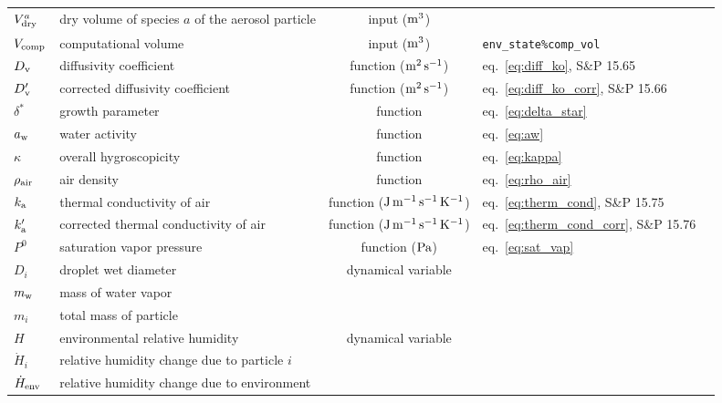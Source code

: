 \documentclass{article}
\begin{document}
\begin{tabular}{lp{4cm}clp{3cm}}
$V^a_{\rm dry}$       & dry volume of species $a$ of the aerosol particle   & input ($\rm m^3$) &    \\
$V_{\rm comp}$ & computational volume & input ($\rm m^3$) & \verb+env_state%comp_vol+\\
\hline
$D_{\rm v}$     & diffusivity coefficient  &  function ($\rm m^2\, s^{-1}$) & eq.~\ref{eq:diff_ko}, S\&P 15.65  \\
$D_{\rm v}'$     & corrected diffusivity coefficient   &  function ($\rm m^2\, s^{-1}$) & eq.~\ref{eq:diff_ko_corr}, S\&P 15.66  \\
$\delta^*$  & growth parameter & function & eq.~\ref{eq:delta_star}\\
$a_{\rm w}$  & water activity  & function & eq.~\ref{eq:aw}   \\
$\kappa$      &  overall hygroscopicity   &  function &  eq.~\ref{eq:kappa}  \\
$\rho_{\rm air}$    &  air density   &  function &  eq.~\ref{eq:rho_air}  \\
$k_{\rm a}$     & thermal conductivity of air   &  function ($\rm J\,m^{-1}\, s^{-1} \, K^{-1}$) &  eq.~\ref{eq:therm_cond}, S\&P 15.75   \\
$k_{\rm a}'$    & corrected thermal conductivity of air   &  function ($\rm J\,m^{-1}\, s^{-1} \, K^{-1}$) &  eq.~\ref{eq:therm_cond_corr}, S\&P 15.76   \\
$P^0$   & saturation vapor pressure &  function ($\rm Pa$) & eq.~\ref{eq:sat_vap}  \\
$D_i$     &  droplet wet diameter  & dynamical variable  &     \\
$m_{\rm  w}$ & mass of water vapor & \\
$m_{i}$ & total mass of particle & \\
$H$     &  environmental relative humidity  &  dynamical variable &  \\
$\dot{H}_i$    & relative humidity change due to particle $i$ &  &  \\
$\dot{H}_{\rm env}$     & relative humidity change due to environment &  &  \\
\hline 
\end{tabular}
\end{document}
